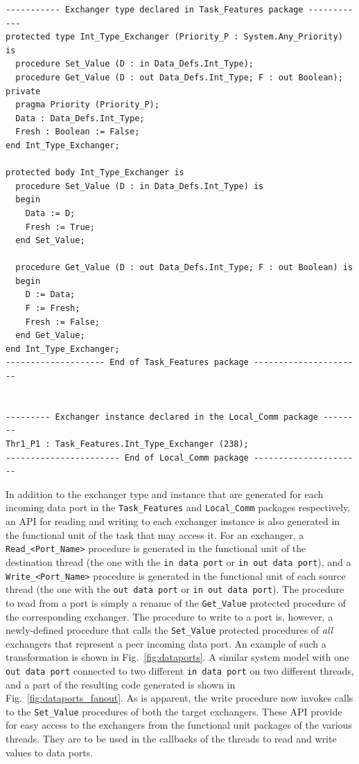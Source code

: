 \begin{minipage}{\listingwidth}
\lstset{language=ada}
\begin{lstlisting}[label=exchangerSpec,caption=The
\texttt{Int\_Type\_Exchanger} generated type]
----------- Exchanger type declared in Task_Features package ------------
protected type Int_Type_Exchanger (Priority_P : System.Any_Priority) is  
  procedure Set_Value (D : in Data_Defs.Int_Type);                       
  procedure Get_Value (D : out Data_Defs.Int_Type; F : out Boolean);     
private
  pragma Priority (Priority_P);
  Data : Data_Defs.Int_Type;
  Fresh : Boolean := False;
end Int_Type_Exchanger;

protected body Int_Type_Exchanger is
  procedure Set_Value (D : in Data_Defs.Int_Type) is
  begin
    Data := D; 
    Fresh := True;
  end Set_Value;

  procedure Get_Value (D : out Data_Defs.Int_Type; F : out Boolean) is
  begin
    D := Data; 
    F := Fresh; 
    Fresh := False;
  end Get_Value;
end Int_Type_Exchanger;
-------------------- End of Task_Features package ----------------------


--------- Exchanger instance declared in the Local_Comm package --------
Thr1_P1 : Task_Features.Int_Type_Exchanger (238);
----------------------- End of Local_Comm package ----------------------
\end{lstlisting}
\end{minipage}

In addition to the exchanger type and instance that are generated for
each incoming data port in the \texttt{Task\_Features} and
\texttt{Local\_Comm} packages respectively, an API for reading and
writing to each exchanger instance is also generated in the functional
unit of the task that may access it. For an exchanger, a
\texttt{Read\_<Port\_Name>} procedure is generated in the functional
unit of the destination thread (the one with the \texttt{in data port}
or \texttt{in out data port}), and a \texttt{Write\_<Port\_Name>}
procedure is generated in the functional unit of each source thread
(the one with the \texttt{out data port} or \texttt{in out data
  port}). The procedure to read from a port is simply a rename of the
\texttt{Get\_Value} protected procedure of the corresponding
exchanger. The procedure to write to a port is, however, a
newly-defined procedure that calls the \texttt{Set\_Value} protected
procedures of \emph{all} exchangers that represent a peer incoming
data port. An example of such a transformation is shown in
Fig.~\ref{fig:dataports}. A similar system model with one \texttt{out
  data port} connected to two different \texttt{in data port} on two
different threads, and a part of the resulting code generated is shown
in Fig.~\ref{fig:dataports_fanout}. As is apparent, the write
procedure now invokes calls to the \texttt{Set\_Value} procedures of
both the target exchangers. These API provide for easy access to the
exchangers from the functional unit packages of the various
threads. They are to be used in the callbacks of the threads to read
and write values to data ports.

